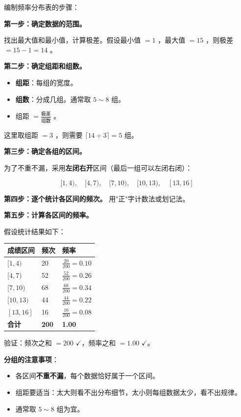 \begin{understand}


编制频率分布表的步骤：

\textbf{第一步：确定数据的范围。}

找出最大值和最小值，计算极差。假设最小值 $= 1$ ，最大值 $= 15$ ，则极差 $= 15 - 1 = 14$ 。

\textbf{第二步：确定组距和组数。}

\begin{itemize}
  \item \textbf{组距}：每组的宽度。
  \item \textbf{组数}：分成几组。通常取 $5 \sim 8$ 组。
  \item 组距 $= \frac{\text{极差}}{\text{组数}}$ 。
\end{itemize}


这里取组距 $= 3$ ，则需要 $\lceil 14 \div 3 \rceil = 5$ 组。

\textbf{第三步：确定各组的区间。}

为了不重不漏，采用\textbf{左闭右开}区间（最后一组可以左闭右闭）：

\[
[1, 4), \quad [4, 7), \quad [7, 10), \quad [10, 13), \quad [13, 16]
\]


\textbf{第四步：逐个统计各区间的频次。} 用"正"字计数法或划记法。

\textbf{第五步：计算各区间的频率。}

假设统计结果如下：

\begin{center}
\begin{tabular}{lll}
\toprule
成绩区间 & 频次 & 频率 \\
\midrule
$[1, 4)$ & 20 & $\frac{20}{200} = 0.10$ \\
$[4, 7)$ & 52 & $\frac{52}{200} = 0.26$ \\
$[7, 10)$ & 68 & $\frac{68}{200} = 0.34$ \\
$[10, 13)$ & 44 & $\frac{44}{200} = 0.22$ \\
$[13, 16]$ & 16 & $\frac{16}{200} = 0.08$ \\
\textbf{合计} & \textbf{200} & \textbf{1.00} \\
\bottomrule
\end{tabular}
\end{center}


验证：频次之和 $= 200$ $\checkmark$，频率之和 $= 1.00$ $\checkmark$。

\textbf{分组的注意事项}：
\begin{itemize}
  \item 各区间\textbf{不重不漏}，每个数据恰好属于一个区间。
  \item 组距要适当：太大则看不出分布细节，太小则每组数据太少，看不出规律。
  \item 通常取 $5 \sim 8$ 组为宜。
\end{itemize}


\end{understand}

